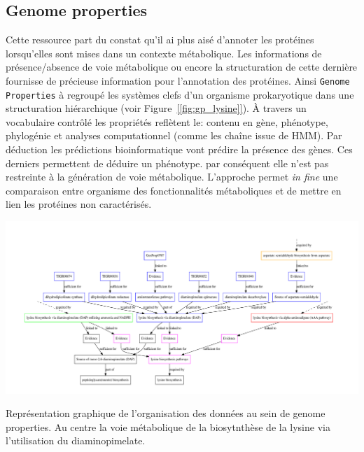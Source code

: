 \begin{refsegment}
    \subsection{Genome properties}
    
    Cette ressource part du constat qu'il ai plus aisé d'annoter les protéines lorsqu'elles sont mises dans un contexte métabolique. Les informations de présence/absence de voie métabolique ou encore la structuration de cette dernière fournisse de précieuse information pour l'annotation des protéines. Ainsi \texttt{Genome Properties} \cite{selengut2007tigrfams,haft2005genome,haft2013tigrfams} à regroupé les systèmes clefs d'un organisme prokaryotique dans une structuration hiérarchique (voir Figure~\cref{[fig:gp_lysine]}). À travers un vocabulaire contrôlé les propriétés reflètent le: contenu en gène, phénotype, phylogénie et analyses computationnel (comme les chaîne issue de \acrfull{HMM}). Par déduction les prédictions bioinformatique vont prédire la présence des gènes. Ces derniers permettent de déduire un phénotype. par conséquent elle n'est pas restreinte à la génération de voie métabolique. L'approche permet \textit{in fine} une comparaison entre organisme des fonctionnalités métaboliques et de mettre en lien les protéines non caractérisés.
    
    \begin{shadedfigure}[H]
        \centering
        \includegraphics[width=\textwidth]{img/lysine_biosynthesis.pdf}
        \caption{ Représentation graphique de l'organisation des données au sein de genome properties. Au centre la voie métabolique de la biosytnthèse de la lysine via l'utilisation du diaminopimelate. }
        \label{fig:gp_lysine}
    \end{shadedfigure}


\end{refsegment}
